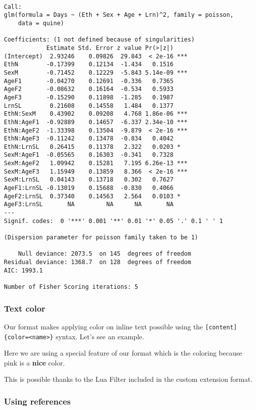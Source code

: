 \documentclass[
]{aft}
\begin{document}
\begin{verbatim}

Call:
glm(formula = Days ~ (Eth + Sex + Age + Lrn)^2, family = poisson, 
    data = quine)

Coefficients: (1 not defined because of singularities)
            Estimate Std. Error z value Pr(>|z|)    
(Intercept)  2.93246    0.09826  29.843  < 2e-16 ***
EthN        -0.17399    0.12134  -1.434   0.1516    
SexM        -0.71452    0.12229  -5.843 5.14e-09 ***
AgeF1       -0.04270    0.12691  -0.336   0.7365    
AgeF2       -0.08632    0.16164  -0.534   0.5933    
AgeF3       -0.15290    0.11898  -1.285   0.1987    
LrnSL        0.21608    0.14558   1.484   0.1377    
EthN:SexM    0.43902    0.09208   4.768 1.86e-06 ***
EthN:AgeF1  -0.92889    0.14657  -6.337 2.34e-10 ***
EthN:AgeF2  -1.33398    0.13504  -9.879  < 2e-16 ***
EthN:AgeF3  -0.11242    0.13478  -0.834   0.4042    
EthN:LrnSL   0.26415    0.11378   2.322   0.0203 *  
SexM:AgeF1  -0.05565    0.16303  -0.341   0.7328    
SexM:AgeF2   1.09942    0.15281   7.195 6.26e-13 ***
SexM:AgeF3   1.15949    0.13859   8.366  < 2e-16 ***
SexM:LrnSL   0.04143    0.13718   0.302   0.7627    
AgeF1:LrnSL -0.13019    0.15688  -0.830   0.4066    
AgeF2:LrnSL  0.37340    0.14563   2.564   0.0103 *  
AgeF3:LrnSL       NA         NA      NA       NA    
---
Signif. codes:  0 '***' 0.001 '**' 0.01 '*' 0.05 '.' 0.1 ' ' 1

(Dispersion parameter for poisson family taken to be 1)

    Null deviance: 2073.5  on 145  degrees of freedom
Residual deviance: 1368.7  on 128  degrees of freedom
AIC: 1993.1

Number of Fisher Scoring iterations: 5
\end{verbatim}

\subsubsection{Text color}\label{sec-summary}

Our format makes applying color on inline text possible using the
\texttt{{[}content{]}\{color=\textless{}name\textgreater{}\}} syntax.
Let's see an example.

Here we are using a special feature of our format which is the coloring
because \textcolor{mypink}{pink is a \textbf{nice} color}.

This is possible thanks to the Lua Filter included in the custom
extension format.

\subsubsection*{Using references}\label{using-references}
\end{document}
